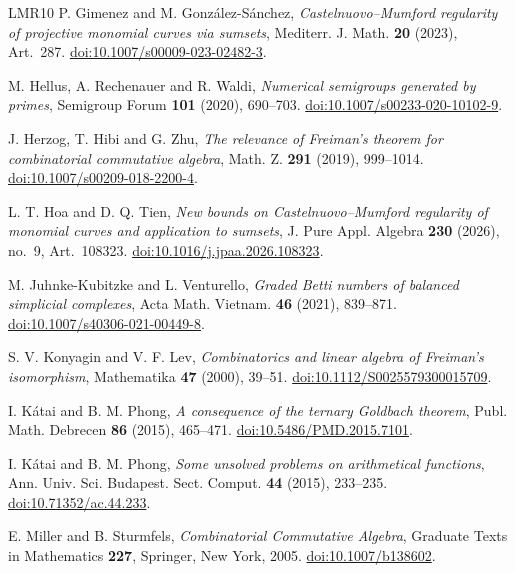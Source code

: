 \begin{thebibliography}{LMR10}
P. Gimenez and M. Gonz\'alez-S\'anchez,
\emph{Castelnuovo--Mumford regularity of projective monomial curves via sumsets},
Mediterr. J. Math. \textbf{20} (2023), Art.~287.
\href{https://doi.org/10.1007/s00009-023-02482-3}{doi:10.1007/s00009-023-02482-3}.

M. Hellus, A. Rechenauer and R. Waldi,
\emph{Numerical semigroups generated by primes},
Semigroup Forum \textbf{101} (2020), 690--703.
\href{https://doi.org/10.1007/s00233-020-10102-9}{doi:10.1007/s00233-020-10102-9}.

J. Herzog, T. Hibi and G. Zhu,
\emph{The relevance of Freiman's theorem for combinatorial commutative algebra},
Math. Z. \textbf{291} (2019), 999--1014.
\href{https://doi.org/10.1007/s00209-018-2200-4}{doi:10.1007/s00209-018-2200-4}.

L. T. Hoa and D. Q. Tien,
\emph{New bounds on Castelnuovo--Mumford regularity of monomial curves and application to sumsets},
J. Pure Appl. Algebra \textbf{230} (2026), no.~9, Art.~108323.
\href{https://doi.org/10.1016/j.jpaa.2026.108323}{doi:10.1016/j.jpaa.2026.108323}.

M. Juhnke-Kubitzke and L. Venturello,
\emph{Graded Betti numbers of balanced simplicial complexes},
Acta Math. Vietnam. \textbf{46} (2021), 839--871.
\href{https://doi.org/10.1007/s40306-021-00449-8}{doi:10.1007/s40306-021-00449-8}.

S. V. Konyagin and V. F. Lev,
\emph{Combinatorics and linear algebra of Freiman's isomorphism},
Mathematika \textbf{47} (2000), 39--51.
\href{https://doi.org/10.1112/S0025579300015709}{doi:10.1112/S0025579300015709}.

I. K\'atai and B. M. Phong,
\emph{A consequence of the ternary Goldbach theorem},
Publ. Math. Debrecen \textbf{86} (2015), 465--471.
\href{https://doi.org/10.5486/PMD.2015.7101}{doi:10.5486/PMD.2015.7101}.

I. K\'atai and B. M. Phong,
\emph{Some unsolved problems on arithmetical functions},
Ann. Univ. Sci. Budapest. Sect. Comput. \textbf{44} (2015), 233--235.
\href{https://doi.org/10.71352/ac.44.233}{doi:10.71352/ac.44.233}.

E. Miller and B. Sturmfels,
\emph{Combinatorial Commutative Algebra}, Graduate Texts in Mathematics
\textbf{227}, Springer, New York, 2005.
\href{https://doi.org/10.1007/b138602}{doi:10.1007/b138602}.


\end{thebibliography}
